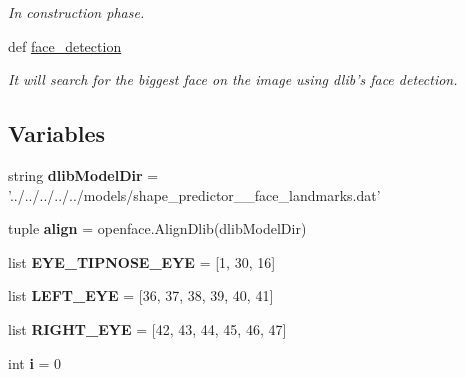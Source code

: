 \begin{DoxyCompactItemize}
\begin{DoxyCompactList}\small\item\em In construction phase. \end{DoxyCompactList}\item 
def \hyperlink{namespaceauxiliary_aa03577afff98ffef325bd105abcd71a0}{face\-\_\-detection}
\begin{DoxyCompactList}\small\item\em It will search for the biggest face on the image using dlib's face detection. \end{DoxyCompactList}\end{DoxyCompactItemize}
\subsection*{Variables}
\begin{DoxyCompactItemize}
\item 
\hypertarget{namespaceauxiliary_a4cc7ef7d9ff9551711628918c1a4dc01}{string {\bfseries dlib\-Model\-Dir} = '../../../../../models/shape\-\_\-predictor\-\_\-\_\-face\-\_\-landmarks.\-dat'}\label{namespaceauxiliary_a4cc7ef7d9ff9551711628918c1a4dc01}

\item 
\hypertarget{namespaceauxiliary_a5691eb4c22b3e1d486fc5ddf9fed97da}{tuple {\bfseries align} = openface.\-Align\-Dlib(dlib\-Model\-Dir)}\label{namespaceauxiliary_a5691eb4c22b3e1d486fc5ddf9fed97da}

\item 
\hypertarget{namespaceauxiliary_a6c46acddbd9e91280255bf9056fd5692}{list {\bfseries E\-Y\-E\-\_\-\-T\-I\-P\-N\-O\-S\-E\-\_\-\-E\-Y\-E} = \mbox{[}1, 30, 16\mbox{]}}\label{namespaceauxiliary_a6c46acddbd9e91280255bf9056fd5692}

\item 
\hypertarget{namespaceauxiliary_a6a0a8a3eae7ad67fd9086a552d5c5fcb}{list {\bfseries L\-E\-F\-T\-\_\-\-E\-Y\-E} = \mbox{[}36, 37, 38, 39, 40, 41\mbox{]}}\label{namespaceauxiliary_a6a0a8a3eae7ad67fd9086a552d5c5fcb}

\item 
\hypertarget{namespaceauxiliary_a34b4c47c2589831a6dc575cb6414dfab}{list {\bfseries R\-I\-G\-H\-T\-\_\-\-E\-Y\-E} = \mbox{[}42, 43, 44, 45, 46, 47\mbox{]}}\label{namespaceauxiliary_a34b4c47c2589831a6dc575cb6414dfab}

\item 
\hypertarget{namespaceauxiliary_ab62e0aef95ec9a50db564924c429bb93}{int {\bfseries i} = 0}\label{namespaceauxiliary_ab62e0aef95ec9a50db564924c429bb93}

\end{DoxyCompactItemize}


